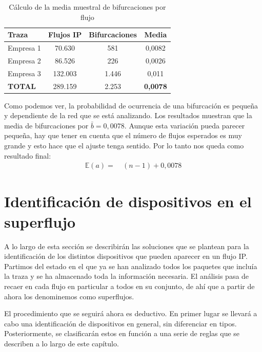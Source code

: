 \documentclass[twoside, 12pt]{epstfg}
\begin{document}
\begin{table}[hbtp]
	\centering
	\begin{tabular}{lccc}
		\toprule \textbf{Traza} & \textbf{Flujos IP}  & \textbf{Bifurcaciones} & \textbf{Media} \\ 
		\midrule
		Empresa 1 & 70.630 & 581 & 0,0082 \\
		Empresa 2 & 86.526 & 226 & 0,0026 \\
		Empresa 3 & 132.003 & 1.446 & 0,011 \\
		\textbf{TOTAL} & 289.159 & 2.253 & \textbf{0,0078} \\
		\bottomrule
	\end{tabular}
	\caption{Cálculo de la media muestral de bifurcaciones por flujo}
	\label{tab:Analisis:Media bifurcaciones}
\end{table}
Como podemos ver, la probabilidad de ocurrencia de una bifurcación es pequeña y dependiente de la red que se está analizando. Los resultados muestran que la media de bifurcaciones por $\bar{b} = 0,0078$. Aunque esta variación pueda parecer pequeña, hay que tener en cuenta que el número de flujos esperados es muy grande y esto hace que el ajuste tenga sentido. Por lo tanto nos queda como resultado final:
\begin{align*}
 \mathbb{E}(a) =&\ (n - 1) + 0,0078
\end{align*}

\section{Identificación de dispositivos en el superflujo}
\label{sec:Analisis:Dispositivos}
A lo largo de esta sección se describirán las soluciones que se plantean para la identificación de los distintos dispositivos que pueden aparecer en un flujo IP. Partimos del estado en el que ya se han analizado todos los paquetes que incluía la traza y se ha almacenado toda la información necesaria. El análisis pasa de recaer en cada flujo en particular a todos en su conjunto, de ahí que a partir de ahora los denominemos como superflujos.

El procedimiento que se seguirá ahora es deductivo. En primer lugar se llevará a cabo una identificación de dispositivos en general, sin diferenciar en tipos. Posteriormente, se clasificarán estos en función a una serie de reglas que se describen a lo largo de este capítulo.
\end{document}
